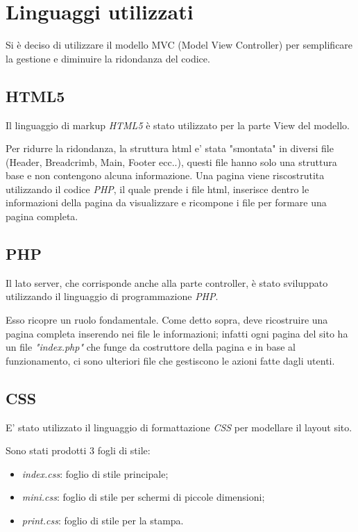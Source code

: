 \section{Linguaggi utilizzati}

Si è deciso di utilizzare il modello MVC (Model View Controller) per semplificare la gestione
e diminuire la ridondanza del codice.

\subsection{HTML5}
Il linguaggio di markup \textit{HTML5} è stato utilizzato per la parte View del modello.

Per ridurre la ridondanza, la struttura html e' stata "smontata" in diversi file (Header, Breadcrimb, Main, Footer ecc..),
questi file hanno solo una struttura base e non contengono alcuna informazione.  Una pagina viene 
riscostrutita utilizzando il codice \textit{PHP}, il quale prende i file html, inserisce dentro le informazioni della pagina da
visualizzare e ricompone i file per formare una pagina completa.

\subsection{PHP}
Il lato server, che corrisponde anche alla parte controller, è stato sviluppato utilizzando il linguaggio di programmazione \textit{PHP}.

Esso ricopre un ruolo fondamentale. Come detto sopra, deve ricostruire una pagina completa 
inserendo nei file le informazioni; infatti ogni pagina del sito ha un file \textit{"index.php"} che funge 
da costruttore della pagina e in base al funzionamento, ci sono ulteriori file che gestiscono le azioni fatte
dagli utenti.


\subsection{CSS}
E' stato utilizzato il linguaggio di formattazione \textit{CSS} per modellare il layout sito.

Sono stati prodotti 3 fogli di stile:
\begin{itemize}
	\item \textit{index.css}: foglio di stile principale;
	\item \textit{mini.css}: foglio di stile per schermi di piccole dimensioni;
	\item \textit{print.css}: foglio di stile per la stampa.
\end{itemize}

